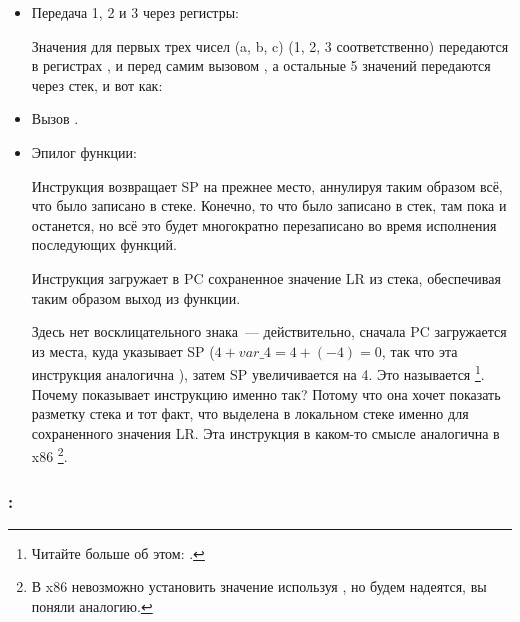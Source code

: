 \begin{itemize}
\item Передача 1, 2 и 3 через регистры:

Значения для первых трех чисел (a, b, c) (1, 2, 3 соответственно) передаются в регистрах 
,  и  перед самим вызовом \printf, а остальные 5 значений передаются через стек, и вот как:

\item Вызов \printf.

\item Эпилог функции:

Инструкция  возвращает \ac{SP} на прежнее место, 
аннулируя таким образом всё, что было записано в стеке.
Конечно, то что было записано в стек, там пока и останется, но всё это будет многократно 
перезаписано во время исполнения последующих функций.

Инструкция  загружает в \ac{PC} 
сохраненное значение \ac{LR} из стека, обеспечивая таким образом выход из функции.

Здесь нет восклицательного знака~--- действительно, сначала \ac{PC} загружается из места, куда указывает \ac{SP}
($4+var\_4=4+(-4)=0$, так что эта инструкция аналогична ), затем \ac{SP} увеличивается 
на 4.
Это называется \footnote{Читайте больше об этом: .}.
Почему \IDA показывает инструкцию именно так?
Потому что она хочет показать разметку стека и тот факт, что  выделена в локальном стеке именно для сохраненного
значения \ac{LR}.
Эта инструкция в каком-то смысле аналогична  в x86
\footnote{В x86 невозможно установить значение  используя \POP, но будем надеятся, вы поняли аналогию.}.

\end{itemize}

\subsubsection{\OptimizingKeilVI: \ThumbMode}

